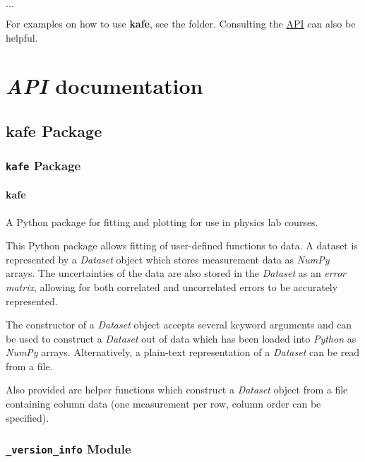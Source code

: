 \documentclass[a4paper,10pt,english]{sphinxmanual}
\begin{document}
$\ldots$

For examples on how to use \textbf{kafe}, see the  folder. Consulting
the {\hyperref[index:api]{API}} can also be helpful.


\chapter{\emph{API} documentation}
\label{index:api-documentation}

\section{kafe Package}
\label{index:api}\label{index:kafe-package}

\subsection{\texttt{kafe} Package}
\label{index:id1}\label{index:module-kafe.__init__}

\subsubsection{kafe}
\label{index:kafe}
A Python package for fitting and plotting for use in physics lab courses.

This Python package allows fitting of user-defined functions to data. A dataset
is represented by a \emph{Dataset} object which stores measurement data as \emph{NumPy}
arrays. The uncertainties of the data are also stored in the \emph{Dataset} as an
\emph{error matrix}, allowing for both correlated and uncorrelated errors to be
accurately represented.

The constructor of a \emph{Dataset} object accepts several keyword arguments and can
be used to construct a \emph{Dataset} out of data which has been loaded into
\emph{Python} as \emph{NumPy} arrays. Alternatively, a plain-text representation of a
\emph{Dataset} can be read from a file.

Also provided are helper functions which construct a \emph{Dataset} object from a
file containing column data (one measurement per row, column order can be
specified).


\subsection{\texttt{\_version\_info} Module}
\label{index:module-kafe._version_info}\label{index:version-info-module}
\end{document}
